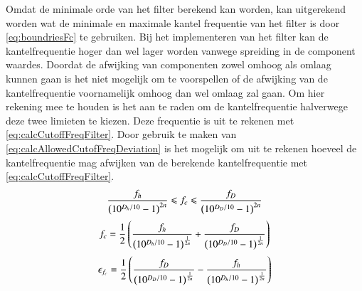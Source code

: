 Omdat de minimale orde van het filter berekend kan worden, kan uitgerekend worden wat de minimale en maximale kantel frequentie van het filter is door \cref{eq:boundriesFc} te gebruiken. Bij het implementeren van het filter kan de kantelfrequentie hoger dan wel lager worden vanwege spreiding in de component waardes. Doordat de afwijking van componenten zowel omhoog als omlaag kunnen gaan is het niet mogelijk om te voorspellen of de afwijking van de kantelfrequentie voornamelijk omhoog dan wel omlaag zal gaan. Om hier rekening mee te houden is het aan te raden om de kantelfrequentie halverwege deze twee limieten te kiezen. Deze frequentie is uit te rekenen met \cref{eq:calcCutoffFreqFilter}. Door gebruik te maken van \cref{eq:calcAllowedCutofFreqDeviation} is het mogelijk om uit te rekenen hoeveel de kantelfrequentie mag afwijken van de berekende kantelfrequentie met \cref{eq:calcCutoffFreqFilter}.
\begin{equation}\label{eq:boundriesFc}
    \frac{f_h}{\left(10^{D_h/10}-1\right)^{2n}}\leqslant f_c\leqslant\frac{f_D}{\left(10^{D_D/10}-1\right)^{2n}}
    \tagaddtext{[\si{\hertz}]}
\end{equation}
\begin{equation}\label{eq:calcCutoffFreqFilter}
    f_c=\frac{1}{2}\left(\frac{f_h}{\left(10^{D_h/10}-1\right)^{\frac{1}{2n}}}+\frac{f_D}{\left(10^{D_D/10}-1\right)^{\frac{1}{2n}}}\right)
    \tagaddtext{[\si{\hertz}]}
\end{equation}
\begin{equation}\label{eq:calcAllowedCutofFreqDeviation}
    \epsilon_{f_c}=\frac{1}{2}\left(\frac{f_D}{\left(10^{D_D/10}-1\right)^{\frac{1}{2n}}}-\frac{f_h}{\left(10^{D_h/10}-1\right)^{\frac{1}{2n}}}\right)
    \tagaddtext{[\si{\hertz}]}
\end{equation}

